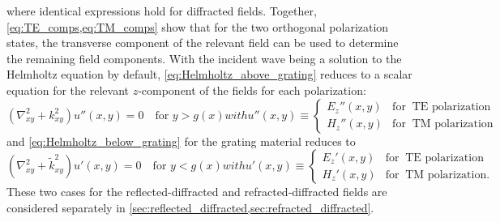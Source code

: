 where identical expressions hold for diffracted fields. 
Together, \cref{eq:TE_comps,eq:TM_comps} show that for the two orthogonal polarization states, the transverse component of the relevant field can be used to determine the remaining field components. 
With the incident wave being a solution to the Helmholtz equation by default, \cref{eq:Helmholtz_above_grating} reduces to a scalar equation for the relevant $z$-component of the fields for each polarization:
\begin{subequations}
\begin{equation}\label{eq:Helmholtz_above_grat_scal}
 \left( \nabla_{xy}^2 +  k_{xy}^2 \right) u'' (x,y) = 0 \quad \text{for } y > g(x) 
 \end{equation}
with 
\begin{equation}
 u'' (x,y) \equiv
   \begin{cases}
     E_z'' (x,y) & \text{for }\ \text{TE polarization} \\
     H_z'' (x,y) & \text{for }\ \text{TM polarization} 
   \end{cases} 
\end{equation}
\end{subequations}
and \cref{eq:Helmholtz_below_grating} for the grating material reduces to
\begin{subequations}
\begin{equation}\label{eq:Helmholtz_below_grat_scal}
 \left( \nabla_{xy}^2 + \tilde{k}_{xy}^2 \right) u' (x,y) = 0 \quad \text{for } y < g(x) 
 \end{equation}
with 
\begin{equation}
 u' (x,y) \equiv
   \begin{cases}
     E_z' (x,y) & \text{for }\ \text{TE polarization} \\
     H_z' (x,y) & \text{for }\ \text{TM polarization.} 
   \end{cases} 
\end{equation}
\end{subequations}
These two cases for the reflected-diffracted and refracted-diffracted fields are considered separately in \cref{sec:reflected_diffracted,sec:refracted_diffracted}. 

